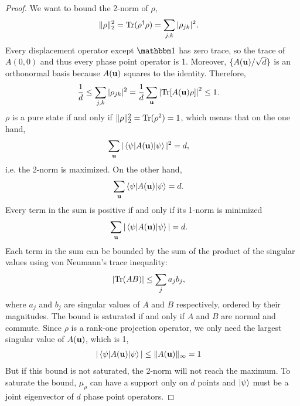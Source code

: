 \begin{proof}
	We want to bound the 2-norm of $\rho$,
	\begin{align}
	\|\rho\|_{2}^{2} & = \mathrm{Tr} (\rho^{\dagger}\rho)
	= \sum_{j,k} |\rho_{jk}|^{2}.
	\end{align}
	Every displacement operator except $\id$ has zero trace, so the trace of $A(0,0)$ and thus every phase point operator is 1. Moreover, $ \{ A({\bf u})/\sqrt{d} \} $ is an orthonormal basis because $A({\bf u})$ squares to the identity. Therefore,
	\begin{align}
	\frac{1}{d} \le  \sum_{j,k} |\rho_{jk}|^{2} &= \frac{1}{d} \sum_{{\bf u}} \left| \mathrm{Tr} [A({\bf u}) \rho] \right|^2 \le 1.
	\end{align}
	$\rho$ is a pure state if and only if $ \|\rho\| _{2}^{2} = \mathrm{Tr} (\rho^2) = 1$, which means that on the one hand,
	\begin{align}
	\sum_{{\bf u}} |\braket{\psi|A({\bf u})|\psi}|^2 &= d, \label{eq:2-norm}
	\end{align}
	i.e. the 2-norm is maximized. On the other hand,
	\begin{align}
	\sum_{{\bf u}} \braket{\psi|A({\bf u})|\psi} &= d.
	\end{align}
	Every term in the sum is positive if and only if its 1-norm is minimized
	\begin{align}
	\sum_{{\bf u}} |\braket{\psi|A({\bf u})|\psi}| &= d.\label{eq:1-norm}
	\end{align}
	Each term in the sum can be bounded by the sum of the product of the singular values using von Neumann's trace inequality:
	\begin{align}
	|\Tr(AB)| &\le \sum_j a_j b_j,\label{eq:trace_ineq}
	\end{align}
	where $a_{j}$ and $b_{j}$ are singular values of $A$ and $B$ respectively,
	ordered by their magnitudes. The bound is saturated if and only if $A$ and
	$B$ are normal and commute. Since $\rho$ is a rank-one projection
	operator, we only need the largest singular value of $A({\bf u})$,
	which is 1,
	\begin{align}
	|\braket{\psi|A({\bf u})|\psi}| &\le \norm{A({\bf u})}_{\infty} = 1\label{eq:baby_holder_ineq}
	\end{align}
	But if this bound is not saturated, the 2-norm will not reach the
	maximum. To saturate the bound, $\mu_{\rho}$ can have a support only
	on $d$ points and ${\left\vert{\psi}\right\rangle}$ must be a joint eigenvector of $d$
	phase point operators.
\end{proof}	

